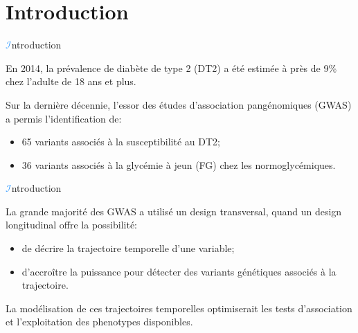 \section{Introduction}
\begin{frame}{{\huge\textcolor{dodgerblue}{$\mathcal{I}$}}ntroduction}
\par{En \textcolor{springgreen3}{2014}, la prévalence de diabète de type 2 (\textcolor{springgreen3}{DT2}) a été estimée à près de
\textcolor{springgreen3}{9\%} chez l'adulte de \textcolor{springgreen3}{18} ans et plus.}
\vspace{1em}
\par{Sur la dernière décennie, l'essor des études d'association pangénomiques (\textcolor{springgreen3}{GWAS}) a permis l'identification de:
    \begin{itemize}
        \item \textcolor{springgreen3}{65} variants associés à la susceptibilité au \textcolor{springgreen3}{DT2};
        \item \textcolor{springgreen3}{36} variants associés à la glycémie à jeun (\textcolor{springgreen3}{FG}) chez les normoglycémiques.
    \end{itemize}
}
\end{frame}


\begin{frame}{{\huge\textcolor{dodgerblue}{$\mathcal{I}$}}ntroduction}
\par{La grande majorité des \textcolor{springgreen3}{GWAS} a utilisé un design transversal, quand un design longitudinal offre la possibilité:
    \begin{itemize}
        \item de décrire la trajectoire temporelle d'une variable;
        \item d'accroître la puissance pour détecter des variants génétiques associés à la trajectoire.
    \end{itemize}
}
\vspace{1em}
\par{La modélisation de ces trajectoires temporelles optimiserait les tests d'association et l'exploitation des phenotypes disponibles.}
\end{frame}


